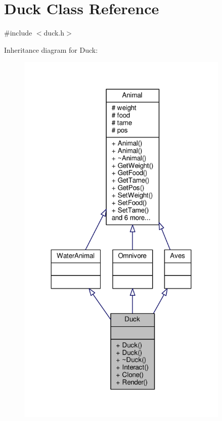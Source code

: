\hypertarget{classDuck}{}\section{Duck Class Reference}
\label{classDuck}


{\ttfamily \#include $<$duck.\+h$>$}



Inheritance diagram for Duck\+:
\nopagebreak
\begin{figure}[H]
\begin{center}
\leavevmode
\includegraphics[width=287pt]{classDuck__inherit__graph}
\end{center}
\end{figure}


